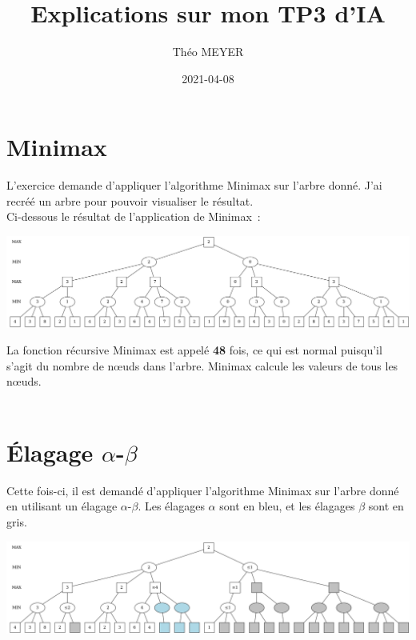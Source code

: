 \documentclass[11pt]{article}
\author{Théo MEYER}
\date{2021-04-08}
\title{Explications sur mon TP3 d'IA}
\begin{document}
\maketitle

\section{Minimax}
\label{sec:orgf3a32d2}

L'exercice demande d'appliquer l'algorithme Minimax sur l'arbre donné. J'ai recréé un arbre pour pouvoir visualiser le résultat.\\

Ci-dessous le résultat de l'application de Minimax :\\

\begin{center}
\includegraphics[width=.9\linewidth]{min_max.png}
\end{center}

La fonction récursive Minimax est appelé \textbf{48} fois, ce qui est normal puisqu'il s'agit du nombre de nœuds dans l'arbre. Minimax calcule les valeurs de tous les nœuds.\\

\pagebreak\\
\section{Élagage \(\alpha\)-\(\beta\)}
\label{sec:orgc1ce491}

Cette fois-ci, il est demandé d'appliquer l'algorithme Minimax sur l'arbre donné en utilisant un élagage \(\alpha\)-\(\beta\). Les élagages \(\alpha\) sont en bleu, et les élagages \(\beta\) sont en gris.\\

\begin{center}
\includegraphics[width=.9\linewidth]{alpha_beta.png}
\end{center}
\end{document}
